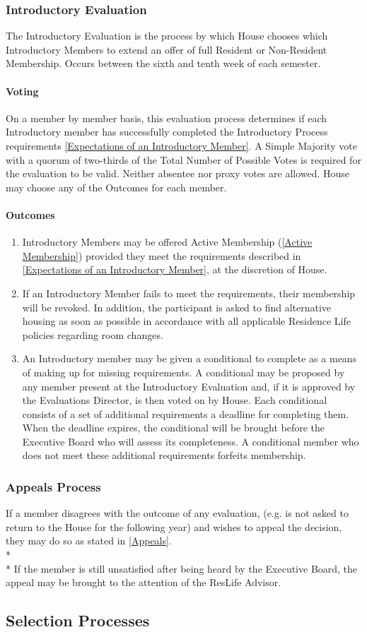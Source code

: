 \documentclass{article}
\newcommand{\bsection}[1]{\subsection{#1} \label{#1}}
\newcommand{\bsubsection}[1]{\subsubsection{#1} \label{#1}}
\newcommand{\bsubsubsection}[1]{\paragraph{#1} \label{#1}}
\begin{document}
\bsubsection{Introductory Evaluation}
The Introductory Evaluation is the process by which House chooses which Introductory Members to extend an offer of full Resident or Non-Resident Membership.
Occurs between the sixth and tenth week of each semester.
\bsubsubsection{Voting}
On a member by member basis, this evaluation process determines if each Introductory member has successfully completed the Introductory Process requirements \ref{Expectations of an Introductory Member}.
A Simple Majority vote with a quorum of two-thirds of the Total Number of Possible Votes is required for the evaluation to be valid.
Neither absentee nor proxy votes are allowed.
House may choose any of the Outcomes for each member.
\bsubsubsection{Outcomes}
\renewcommand{\theenumi}{\alph{enumi}} %
\begin{enumerate}
	\item Introductory Members may be offered Active Membership (\ref{Active Membership}) provided they meet the requirements described in \ref{Expectations of an Introductory Member}, at the discretion of House.
	\item If an Introductory Member fails to meet the requirements, their membership will be revoked.
		In addition, the participant is asked to find alternative housing as soon as possible in accordance with all applicable Residence Life policies regarding room changes.
	\item An Introductory member may be given a conditional to complete as a means of making up for missing requirements.
		A conditional may be proposed by any member present at the Introductory Evaluation and, if it is approved by the Evaluations Director, is then voted on by House.
		Each conditional consists of a set of additional requirements a deadline for completing them.
		When the deadline expires, the conditional will be brought before the Executive Board who will assess its completeness.
		A conditional member who does not meet these additional requirements forfeits membership.
\end{enumerate}
\bsubsection{Appeals Process}
If a member disagrees with the outcome of any evaluation, (e.g. is not asked to return to the House for the following year) and wishes to appeal the decision, they may do so as stated in \ref{Appeals}.
\\* \\*
If the member is still unsatisfied after being heard by the Executive Board, the appeal may be brought to the attention of the ResLife Advisor.
\bsection{Selection Processes}
\end{document}

